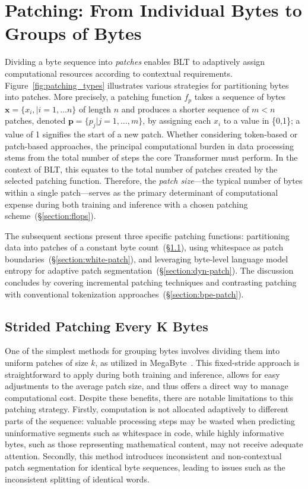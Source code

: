 \section{Patching: From Individual Bytes to Groups of Bytes}
\label{section:patching}

Dividing a byte sequence into \textit{patches} enables {\textsc BLT} to adaptively assign computational resources according to contextual requirements. Figure~\ref{fig:patching_types} illustrates various strategies for partitioning bytes into patches. More precisely, a patching function $f_p$ takes a sequence of bytes $\pmb{x}=\{x_i,|i=1,\ldots n\}$ of length $n$ and produces a shorter sequence of $m < n$ patches, denoted $\pmb{p}=\{p_j|j=1,\ldots,m\}$, by assigning each $x_i$ to a value in \{0,1\}; a value of 1 signifies the start of a new patch. Whether considering token-based or patch-based approaches, the principal computational burden in data processing stems from the total number of steps the core Transformer must perform. In the context of {\textsc BLT}, this equates to the total number of patches created by the selected patching function. Therefore, the \textit{patch size}—the typical number of bytes within a single patch—serves as the primary determinant of computational expense during both training and inference with a chosen patching scheme~(\S\ref{section:flops}).

The subsequent sections present three specific patching functions: partitioning data into patches of a constant byte count~(\S\ref{section:static-patch}), using whitespace as patch boundaries~(\S\ref{section:white-patch}), and leveraging byte-level language model entropy for adaptive patch segmentation~(\S\ref{section:dyn-patch}). The discussion concludes by covering incremental patching techniques and contrasting patching with conventional tokenization approaches~(\S\ref{section:bpe-patch}).

\subsection{Strided Patching Every K Bytes}
\label{section:static-patch}

One of the simplest methods for grouping bytes involves dividing them into uniform patches of size $k$, as utilized in MegaByte~\citep{yu2023megabyte}. This fixed-stride approach is straightforward to apply during both training and inference, allows for easy adjustments to the average patch size, and thus offers a direct way to manage computational cost. Despite these benefits, there are notable limitations to this patching strategy. Firstly, computation is not allocated adaptively to different parts of the sequence: valuable processing steps may be wasted when predicting uninformative segments such as whitespace in code, while highly informative bytes, such as those representing mathematical content, may not receive adequate attention. Secondly, this method introduces inconsistent and non-contextual patch segmentation for identical byte sequences, leading to issues such as the inconsistent splitting of identical words.


